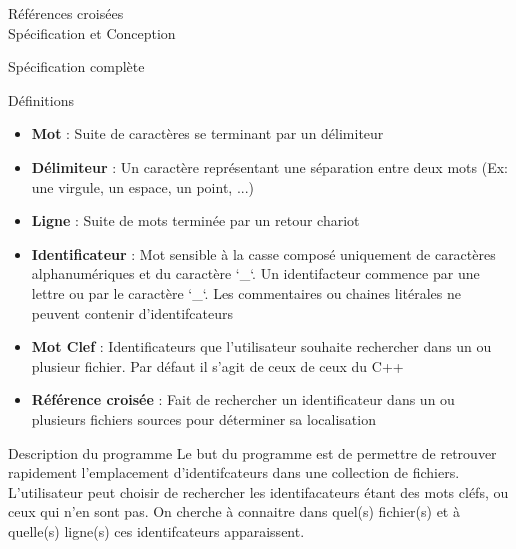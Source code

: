 \documentclass{article}
\begin{document}
\begin{center} 
\Huge{Références croisées \\ Spécification et Conception}
\end{center}



\begin{section}{Spécification complète}


  \begin{subsection}{Définitions}

    \begin{itemize}

      \item \textbf{Mot} : Suite de caractères se terminant par un délimiteur

      \item \textbf{Délimiteur} : Un caractère représentant une séparation entre deux mots (Ex: une virgule, un espace, un point, ...) 

      \item \textbf{Ligne} : Suite de mots terminée par un retour chariot

      \item \textbf{Identificateur} : Mot sensible à la casse composé uniquement de caractères alphanumériques et du caractère `\_`. 
				      Un identifacteur commence par une lettre ou par le caractère `\_`.
				      Les commentaires ou chaines litérales ne peuvent contenir d'identifcateurs
				     
      \item \textbf{Mot Clef} : Identificateurs que l'utilisateur souhaite rechercher dans un ou plusieur fichier. Par défaut il s'agit de ceux de ceux du C++

      \item \textbf{Référence croisée} : Fait de rechercher un identificateur dans un ou plusieurs fichiers sources pour déterminer sa localisation
    \end{itemize}

  \end{subsection}


  \begin{subsection}{Description du programme}
    Le but du programme est de permettre de retrouver rapidement l'emplacement d'identifcateurs dans une collection de fichiers.
    L'utilisateur peut choisir de rechercher les identifacateurs étant des mots cléfs, ou ceux qui n'en sont pas.
    On cherche à connaitre dans quel(s) fichier(s) et à quelle(s) ligne(s) ces identifcateurs apparaissent.
    

\end{subsection}
\end{section}
\end{document}
